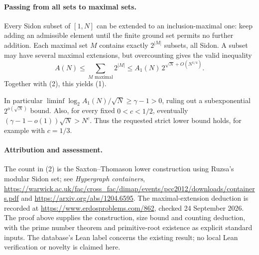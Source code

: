 \paragraph{Passing from all sets to maximal sets.}
Every Sidon subset of \([1,N]\) can be extended to an inclusion-maximal one: keep adding an admissible element until the finite ground set permits no further addition. Each maximal set \(M\) contains exactly \(2^{|M|}\) subsets, all Sidon. A subset may have several maximal extensions, but overcounting gives the valid inequality
\[
 A(N)\leq\sum_{M\text{ maximal}}2^{|M|}
 \leq A_1(N)\,2^{\sqrt N+O(N^{1/4})}.
\]
Together with (2), this yields (1).

In particular \(\liminf \log_2A_1(N)/\sqrt N\geq\gamma-1>0\), ruling out a subexponential \(2^{o(\sqrt N)}\) bound. Also, for every fixed \(0<c<1/2\), eventually \((\gamma-1-o(1))\sqrt N>N^c\). Thus the requested strict lower bound holds, for example with \(c=1/3\).

\paragraph{Attribution and assessment.}
The count in (2) is the Saxton--Thomason lower construction using Ruzsa's modular Sidon set; see \emph{Hypergraph containers}, \url{https://warwick.ac.uk/fac/cross_fac/dimap/events/pcc2012/downloads/containers.pdf} and \url{https://arxiv.org/abs/1204.6595}. The maximal-extension deduction is recorded at \url{https://www.erdosproblems.com/862}, checked 24 September 2026. The proof above supplies the construction, size bound and counting deduction, with the prime number theorem and primitive-root existence as explicit standard inputs. The database's Lean label concerns the existing result; no local Lean verification or novelty is claimed here.
